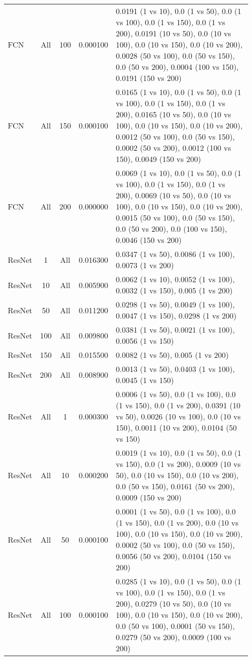 \begin{tabular}{|l|c|c|c|p{7cm}|}
FCN & All & 100 & 0.000100 & 0.0191 (1 vs 10), 0.0 (1 vs 50), 0.0 (1 vs 100), 0.0 (1 vs 150), 0.0 (1 vs 200), 0.0191 (10 vs 50), 0.0 (10 vs 100), 0.0 (10 vs 150), 0.0 (10 vs 200), 0.0028 (50 vs 100), 0.0 (50 vs 150), 0.0 (50 vs 200), 0.0004 (100 vs 150), 0.0191 (150 vs 200) \\
FCN & All & 150 & 0.000100 & 0.0165 (1 vs 10), 0.0 (1 vs 50), 0.0 (1 vs 100), 0.0 (1 vs 150), 0.0 (1 vs 200), 0.0165 (10 vs 50), 0.0 (10 vs 100), 0.0 (10 vs 150), 0.0 (10 vs 200), 0.0012 (50 vs 100), 0.0 (50 vs 150), 0.0002 (50 vs 200), 0.0012 (100 vs 150), 0.0049 (150 vs 200) \\
FCN & All & 200 & 0.000000 & 0.0069 (1 vs 10), 0.0 (1 vs 50), 0.0 (1 vs 100), 0.0 (1 vs 150), 0.0 (1 vs 200), 0.0069 (10 vs 50), 0.0 (10 vs 100), 0.0 (10 vs 150), 0.0 (10 vs 200), 0.0015 (50 vs 100), 0.0 (50 vs 150), 0.0 (50 vs 200), 0.0 (100 vs 150), 0.0046 (150 vs 200) \\
ResNet & 1 & All & 0.016300 & 0.0347 (1 vs 50), 0.0086 (1 vs 100), 0.0073 (1 vs 200) \\
ResNet & 10 & All & 0.005900 & 0.0062 (1 vs 10), 0.0052 (1 vs 100), 0.0032 (1 vs 150), 0.005 (1 vs 200) \\
ResNet & 50 & All & 0.011200 & 0.0298 (1 vs 50), 0.0049 (1 vs 100), 0.0047 (1 vs 150), 0.0298 (1 vs 200) \\
ResNet & 100 & All & 0.009800 & 0.0381 (1 vs 50), 0.0021 (1 vs 100), 0.0056 (1 vs 150) \\
ResNet & 150 & All & 0.015500 & 0.0082 (1 vs 50), 0.005 (1 vs 200) \\
ResNet & 200 & All & 0.008900 & 0.0013 (1 vs 50), 0.0403 (1 vs 100), 0.0045 (1 vs 150) \\
ResNet & All & 1 & 0.000300 & 0.0006 (1 vs 50), 0.0 (1 vs 100), 0.0 (1 vs 150), 0.0 (1 vs 200), 0.0391 (10 vs 50), 0.0026 (10 vs 100), 0.0 (10 vs 150), 0.0011 (10 vs 200), 0.0104 (50 vs 150) \\
ResNet & All & 10 & 0.000200 & 0.0019 (1 vs 10), 0.0 (1 vs 50), 0.0 (1 vs 150), 0.0 (1 vs 200), 0.0009 (10 vs 50), 0.0 (10 vs 150), 0.0 (10 vs 200), 0.0 (50 vs 150), 0.0161 (50 vs 200), 0.0009 (150 vs 200) \\
ResNet & All & 50 & 0.000100 & 0.0001 (1 vs 50), 0.0 (1 vs 100), 0.0 (1 vs 150), 0.0 (1 vs 200), 0.0 (10 vs 100), 0.0 (10 vs 150), 0.0 (10 vs 200), 0.0002 (50 vs 100), 0.0 (50 vs 150), 0.0056 (50 vs 200), 0.0104 (150 vs 200) \\
ResNet & All & 100 & 0.000100 & 0.0285 (1 vs 10), 0.0 (1 vs 50), 0.0 (1 vs 100), 0.0 (1 vs 150), 0.0 (1 vs 200), 0.0279 (10 vs 50), 0.0 (10 vs 100), 0.0 (10 vs 150), 0.0 (10 vs 200), 0.0 (50 vs 100), 0.0001 (50 vs 150), 0.0279 (50 vs 200), 0.0009 (100 vs 200) \\

\end{tabular}

